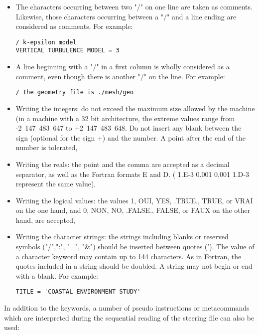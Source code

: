 \begin{itemize}
\item The characters occurring between two "/" on one line are taken as
comments. Likewise, those characters occurring between a "/" and a line ending
are considered as comments. For example:

\begin{lstlisting}[language=TelemacCas]
/ k-epsilon model
VERTICAL TURBULENCE MODEL = 3
\end{lstlisting}

\item A line beginning with a "/" in a first column is wholly considered as a
comment, even though there is another "/" on the line. For example:

\begin{lstlisting}[language=TelemacCas]
/ The geometry file is ./mesh/geo
\end{lstlisting}

\item Writing the integers: do not exceed the maximum size allowed by the
machine (in a machine with a 32 bit architecture, the extreme values range from
-2~147~483~647 to +2~147~483~648. Do not insert any blank between the sign
(optional for the sign +) and the number. A point after the end of the number
is tolerated,

\item Writing the reals: the point and the comma are accepted as a decimal
separator, as well as the Fortran formats E and D. ( 1.E-3  0.001  0,001  1.D-3
represent the same value),

\item Writing the logical values: the values 1, OUI,  YES,  .TRUE.,  TRUE,  or
VRAI on the one hand, and 0, NON,  NO,  .FALSE.,  FALSE, or FAUX on the other
hand, are accepted,

\item Writing the character strings: the strings including blanks or reserved
symbols ("/",":", "=", "\&") should be inserted between quotes ('). The value
of a character keyword may contain up to 144 characters. As in Fortran, the
quotes included in a string should be doubled. A string may not begin or end
with a blank. For example:

\begin{lstlisting}[language=TelemacCas]
TITLE = 'COASTAL ENVIRONMENT STUDY'
\end{lstlisting}

\end{itemize}

In addition to the keywords, a number of pseudo instructions or metacommands
which are interpreted during the sequential reading of the steering file can
also be used:

